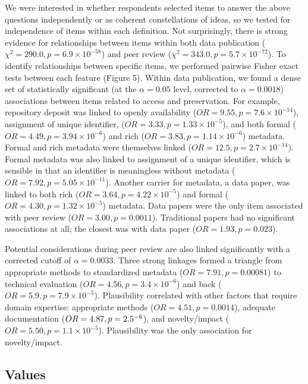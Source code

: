 \documentclass[10pt]{article}
\begin{document}
We were interested in whether respondents selected items to answer the above questions independently or as coherent constellations of ideas, so we tested for independence of items within each definition. 
Not surprisingly, there is strong evidence for relationships between items within both data publication ($\chi^{2}=290.0, p=6.9\times10^{-58}$) and peer review ($\chi^{2}= 343.0, p= 5.7\times10^{-72}$).
To identify relationships between specific items, we performed pairwise Fisher exact tests between each feature (Figure 5).
Within data publication, we found a dense set of statistically significant (at the $\alpha=0.05$ level, corrected to $\alpha=0.0018$) associations between items related to access and preservation.
For example, repository deposit was linked to openly availability ($OR=9.55, p=7.6\times10^{-14}$), assignment of unique identifier, ($OR= 3.33, p= 1.33\times10^{-5}$), and both formal ($OR= 4.49, p= 3.94\times10^{-6}$) and rich ($OR= 3.83, p=1.14\times10^{-6}$) metadata.
Formal and rich metadata were themselves linked ($OR= 12.5, p=2.7\times10^{-14}$). 
Formal metadata was also linked to assignment of a unique identifier, which is sensible in that an identifier is meaningless without metadata ($OR= 7.92, p= 5.05\times10^{-11}$).
Another carrier for metadata, a data paper, was linked to both rich ($OR=3.64, p=4.22\times10^{-5}$) and formal ($OR=4.30, p=1.32\times10^{-5}$) metadata.
Data papers were the only item associated with peer review ($OR=3.00, p=0.0011$).
Traditional papers had no significant associations at all; the closest was with data paper ($OR=1.93, p=0.023$).

Potential considerations during peer review are also linked significantly with a corrected cutoff of $\alpha=0.0033$.
Three strong linkages formed a triangle from appropriate methods to standardized metadata ($OR=7.91, p=0.00081$) to technical evaluation ($OR=4.56, p=3.4\times10^{-6}$) and back ($OR=5.9, p=7.9\times10^{-5}$).
Plausibility correlated with other factors that require domain expertise: appropriate methods ($OR=4.51, p=0.0014$), adequate documentation ($OR=4.87, p=2.5\time10^{-6}$), and novelty/impact ($OR=5.50, p=1.1\times10^{-5}$).
Plausibility was the only association for novelty/impact.

\subsection*{Values}
\end{document}
